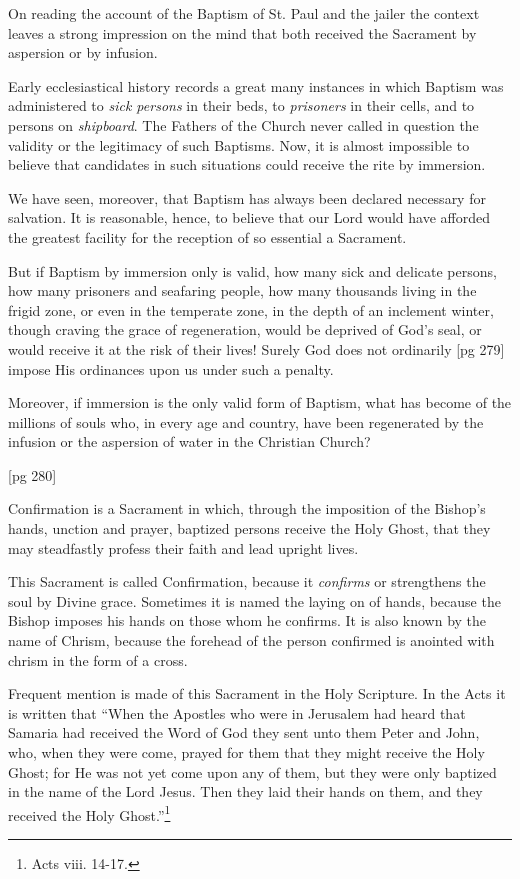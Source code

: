On reading the account of the Baptism of St.
Paul and the jailer the context leaves a strong impression
on the mind that both received the Sacrament
by aspersion or by infusion.

Early ecclesiastical history records a great
many instances in which Baptism was administered
to \emph{sick persons} in their beds, to \emph{prisoners} in
their cells, and to persons on \emph{shipboard}. The
Fathers of the Church never called in question the
validity or the legitimacy of such Baptisms. Now,
it is almost impossible to believe that candidates
in such situations could receive the rite by immersion.

We have seen, moreover, that Baptism has always
been declared necessary for salvation. It is
reasonable, hence, to believe that our Lord would
have afforded the greatest facility for the reception
of so essential a Sacrament.

But if Baptism by immersion only is valid, how
many sick and delicate persons, how many prisoners
and seafaring people, how many thousands
living in the frigid zone, or even in the temperate
zone, in the depth of an inclement winter, though
craving the grace of regeneration, would be deprived
of God's seal, or would receive it at the risk
of their lives! Surely God does not ordinarily
[pg 279]
impose His ordinances upon us under such a
penalty.

Moreover, if immersion is the only valid form
of Baptism, what has become of the millions of
souls who, in every age and country, have been
regenerated by the infusion or the aspersion of
water in the Christian Church?

[pg 280]


Confirmation is a Sacrament in which,
through the imposition of the Bishop's
hands, unction and prayer, baptized persons
receive the Holy Ghost, that they may steadfastly
profess their faith and lead upright lives.

This Sacrament is called Confirmation, because
it \emph{confirms} or strengthens the soul by Divine grace.
Sometimes it is named the laying on of hands, because
the Bishop imposes his hands on those
whom he confirms. It is also known by the name
of Chrism, because the forehead of the person confirmed
is anointed with chrism in the form of a
cross.

Frequent mention is made of this Sacrament in
the Holy Scripture. In the Acts it is written that
“When the Apostles who were in Jerusalem had
heard that Samaria had received the Word of God
they sent unto them Peter and John, who, when
they were come, prayed for them that they might
receive the Holy Ghost; for He was not yet come
upon any of them, but they were only baptized
in the name of the Lord Jesus. Then they laid
their hands on them, and they received the Holy
Ghost.”\footnote{Acts viii. 14-17.}

